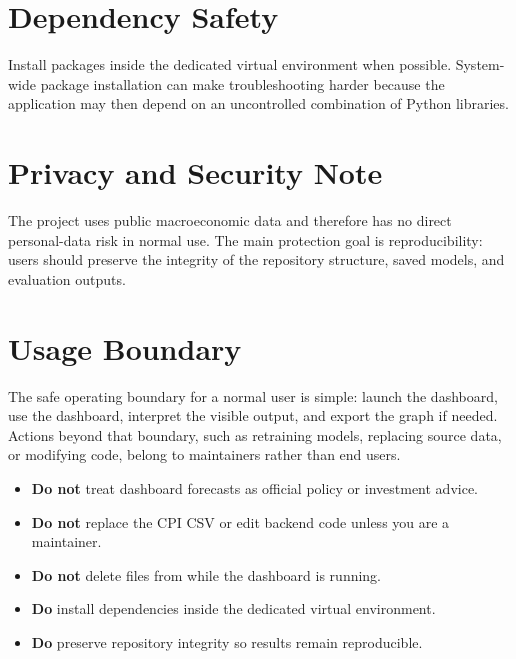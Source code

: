 \section{Dependency Safety}

Install packages inside the dedicated virtual environment when possible. System-wide package installation can make troubleshooting harder because the application may then depend on an uncontrolled combination of Python libraries.

\section{Privacy and Security Note}

The project uses public macroeconomic data and therefore has no direct personal-data risk in normal use. The main protection goal is reproducibility: users should preserve the integrity of the repository structure, saved models, and evaluation outputs.

\section{Usage Boundary}

The safe operating boundary for a normal user is simple: launch the dashboard, use the dashboard, interpret the visible output, and export the graph if needed. Actions beyond that boundary, such as retraining models, replacing source data, or modifying code, belong to maintainers rather than end users.

\begin{tcolorbox}[colback=red!5!white, colframe=red!75!black, title=Safety at a Glance]
\begin{itemize}
    \item \textbf{Do not} treat dashboard forecasts as official policy or investment advice.
    \item \textbf{Do not} replace the CPI CSV or edit backend code unless you are a maintainer.
    \item \textbf{Do not} delete files from  while the dashboard is running.
    \item \textbf{Do} install dependencies inside the dedicated virtual environment.
    \item \textbf{Do} preserve repository integrity so results remain reproducible.
\end{itemize}
\end{tcolorbox}
